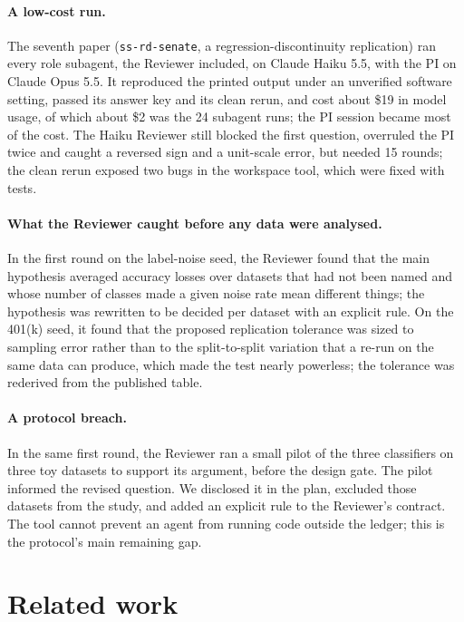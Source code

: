 \documentclass[11pt]{article}
\begin{document}
\paragraph{A low-cost run.} The seventh paper (\texttt{ss-rd-senate}, a
regression-discontinuity replication) ran every role subagent, the Reviewer included, on
Claude Haiku 5.5, with the PI on Claude Opus 5.5. It reproduced the printed output under
an unverified software setting, passed its answer key and its clean rerun, and cost about
\$19 in model usage, of which about \$2 was the 24 subagent runs; the PI session became
most of the cost. The Haiku Reviewer still blocked the first question, overruled the PI
twice and caught a reversed sign and a unit-scale error, but needed 15 rounds; the clean
rerun exposed two bugs in the workspace tool, which were fixed with tests.

\paragraph{What the Reviewer caught before any data were analysed.} In the first round
on the label-noise seed, the Reviewer found that the main hypothesis averaged accuracy
losses over datasets that had not been named and whose number of classes made a given
noise rate mean different things; the hypothesis was rewritten to be decided per
dataset with an explicit rule. On the 401(k) seed, it found that the proposed
replication tolerance was sized to sampling error rather than to the split-to-split
variation that a re-run on the same data can produce, which made the test nearly
powerless; the tolerance was rederived from the published table.

\paragraph{A protocol breach.} In the same first round, the Reviewer ran a small pilot
of the three classifiers on three toy datasets to support its argument, before the
design gate. The pilot informed the revised question. We disclosed it in the plan,
excluded those datasets from the study, and added an explicit rule to the Reviewer's
contract. The tool cannot prevent an agent from running code outside the ledger; this is
the protocol's main remaining gap.

\section{Related work}\label{sec:related}
\end{document}
